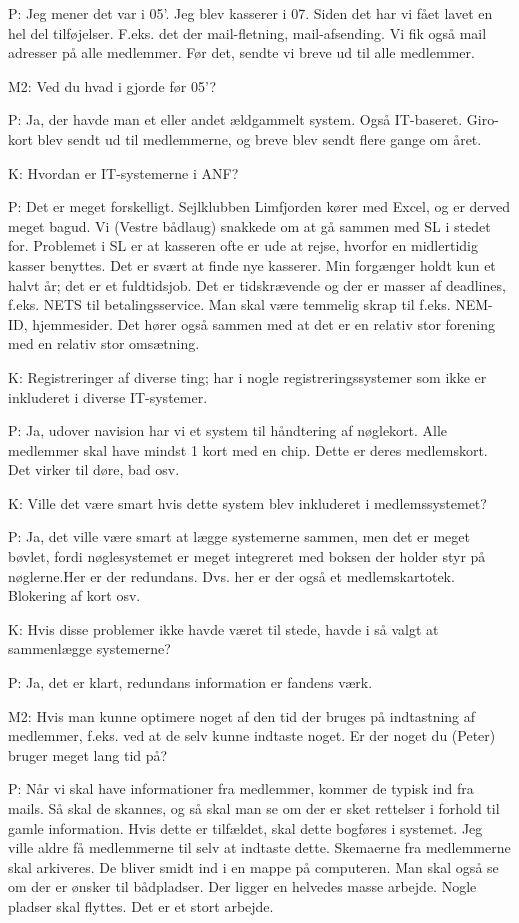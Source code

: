 \documentclass{article}
\begin{document}
P: Jeg mener det var i 05'. Jeg blev kasserer i 07. Siden det har vi fået lavet en hel del tilføjelser. F.eks. det der mail-fletning, mail-afsending. Vi fik også mail adresser på alle medlemmer. Før det, sendte vi breve ud til alle medlemmer.

M2: Ved du hvad i gjorde før 05'?

P: Ja, der havde man et eller andet ældgammelt system. Også IT-baseret. Giro-kort blev sendt ud til medlemmerne, og breve blev sendt flere gange om året.

K: Hvordan er IT-systemerne i ANF?

P: Det er meget forskelligt. Sejlklubben Limfjorden kører med Excel, og er derved meget bagud. Vi (Vestre bådlaug) snakkede om at gå sammen med SL i stedet for. Problemet i SL er at kasseren ofte er ude at rejse, hvorfor en midlertidig kasser benyttes. Det er svært at finde nye kasserer. Min forgænger holdt kun et halvt år; det er et fuldtidsjob. Det er tidskrævende og der er masser af deadlines, f.eks. NETS til betalingsservice. Man skal være temmelig skrap til f.eks. NEM-ID, hjemmesider. Det hører også sammen med at det er en relativ stor forening med en relativ stor omsætning.

K: Registreringer af diverse ting; har i nogle registreringssystemer som ikke er inkluderet i diverse IT-systemer.

P: Ja, udover navision har vi et system til håndtering af nøglekort. Alle medlemmer skal have mindst 1 kort med en chip. Dette er deres medlemskort. Det virker til døre, bad osv.

K: Ville det være smart hvis dette system blev inkluderet i medlemssystemet?

P: Ja, det ville være smart at lægge systemerne sammen, men det er meget bøvlet, fordi nøglesystemet er meget integreret med boksen der holder styr på nøglerne.Her er der redundans. Dvs. her er der også et medlemskartotek. Blokering af kort osv. 

K: Hvis disse problemer ikke havde været til stede, havde i så valgt at sammenlægge systemerne?

P: Ja, det er klart, redundans information er fandens værk.

M2: Hvis man kunne optimere noget af den tid der bruges på indtastning af medlemmer, f.eks. ved at de selv kunne indtaste noget. Er der noget du (Peter) bruger meget lang tid på?

P: Når vi skal have informationer fra medlemmer, kommer de typisk ind fra mails. Så skal de skannes, og så skal man se om der er sket rettelser i forhold til gamle information. Hvis dette er tilfældet, skal dette bogføres i systemet. Jeg ville aldre få medlemmerne til selv at indtaste dette. Skemaerne fra medlemmerne skal arkiveres. De bliver smidt ind i en mappe på computeren. Man skal også se om der er ønsker til bådpladser. Der ligger en helvedes masse arbejde. Nogle pladser skal flyttes. Det er et stort arbejde.
\end{document}
